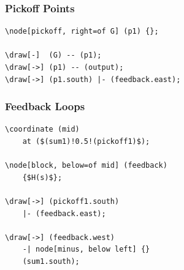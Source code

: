 \begin{center}
\end{center}


\subsubsection{Pickoff Points}

\begin{lstlisting}[style=latex]
\node[pickoff, right=of G] (p1) {};

\draw[-]  (G) -- (p1);
\draw[->] (p1) -- (output);
\draw[->] (p1.south) |- (feedback.east);
\end{lstlisting}


\subsubsection{Feedback Loops}

\begin{lstlisting}[style=latex]
\coordinate (mid)
    at ($(sum1)!0.5!(pickoff1)$);

\node[block, below=of mid] (feedback)
    {$H(s)$};

\draw[->] (pickoff1.south)
    |- (feedback.east);

\draw[->] (feedback.west)
    -| node[minus, below left] {}
    (sum1.south);
\end{lstlisting}

